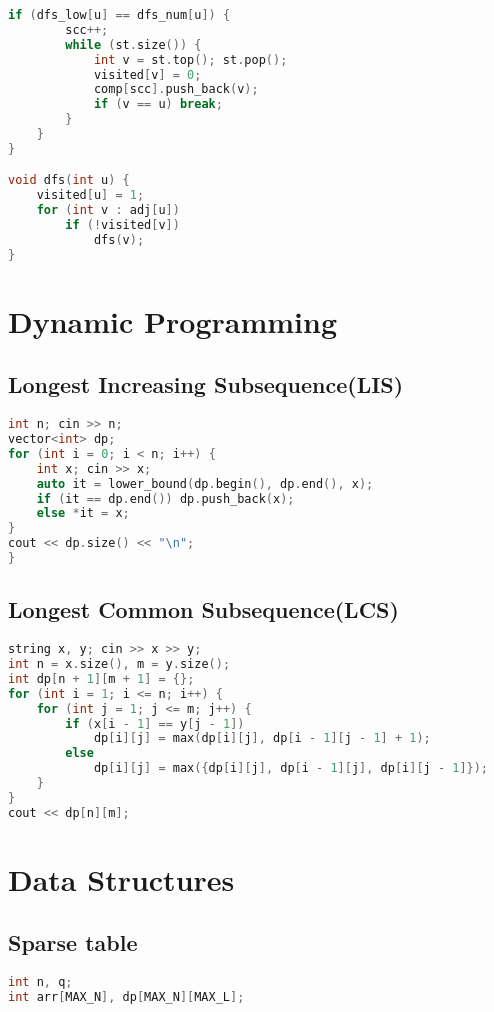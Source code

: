 \documentclass{article}
\begin{document}
\begin{multicols}{2}
\begin{lstlisting}[linewidth=\columnwidth,breaklines=true,language=C++]
    if (dfs_low[u] == dfs_num[u]) {
        scc++;
        while (st.size()) {
            int v = st.top(); st.pop();
            visited[v] = 0;
            comp[scc].push_back(v);
            if (v == u) break;
        }
    }
}

void dfs(int u) {
    visited[u] = 1;
    for (int v : adj[u])
        if (!visited[v])
            dfs(v);
}
\end{lstlisting}
\section{Dynamic Programming}
\subsection{Longest Increasing Subsequence(LIS)}
\lstset {    language=C++,
    basicstyle=\small\ttfamily,
    numbers=left,
    breaklines=true,
    tabsize=4}
\begin{lstlisting}[linewidth=\columnwidth,breaklines=true,language=C++]
int n; cin >> n;
vector<int> dp;
for (int i = 0; i < n; i++) {
    int x; cin >> x;
    auto it = lower_bound(dp.begin(), dp.end(), x);
    if (it == dp.end()) dp.push_back(x);
    else *it = x;
}
cout << dp.size() << "\n";
}
\end{lstlisting}
\subsection{Longest Common Subsequence(LCS)}
\lstset {    language=C++,
    basicstyle=\small\ttfamily,
    numbers=left,
    breaklines=true,
    tabsize=4}
\begin{lstlisting}[linewidth=\columnwidth,breaklines=true,language=C++]
string x, y; cin >> x >> y;
int n = x.size(), m = y.size();
int dp[n + 1][m + 1] = {};
for (int i = 1; i <= n; i++) {
    for (int j = 1; j <= m; j++) {
        if (x[i - 1] == y[j - 1]) 
            dp[i][j] = max(dp[i][j], dp[i - 1][j - 1] + 1);
        else
            dp[i][j] = max({dp[i][j], dp[i - 1][j], dp[i][j - 1]});
    }
}
cout << dp[n][m];
\end{lstlisting}
\section{Data Structures}
\subsection{Sparse table}
\lstset {    language=C++,
    basicstyle=\small\ttfamily,
    numbers=left,
    breaklines=true,
    tabsize=4}
\begin{lstlisting}[linewidth=\columnwidth,breaklines=true,language=C++]
int n, q;
int arr[MAX_N], dp[MAX_N][MAX_L];
 

\end{lstlisting}
\end{multicols}
\end{document}
